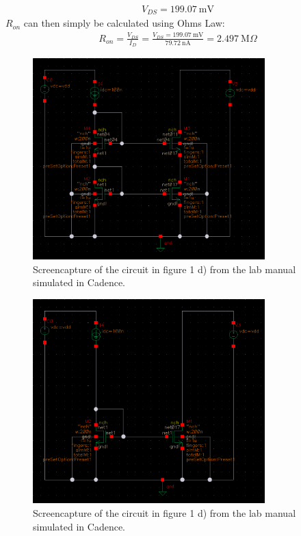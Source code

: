 \documentclass[onecolumn]{article}
\begin{document}
\begin{align}
    V_{DS} = 199.07 \ \text{mV} \nonumber
\end{align}
$R_{on}$ can then simply be calculated using Ohms Law:
\begin{align}
    R_{on} = \frac{V_{DS}}{I_D} = \frac{V_{DS} = 199.07 \ \text{mV}}{79.72 \ \text{nA}} = 2.497 \ \text{M}\Omega
\end{align}
\begin{figure}[h!]
    \centering
    \includegraphics[width=0.8\textwidth]{circuit_d_cascode.png}
    \caption{Screencapture of the circuit in figure 1 d) from the lab manual simulated in Cadence.}
    \label{fig:circuitd}
\end{figure}

\begin{figure}[h!]
    \centering
    \includegraphics[width=0.8\textwidth]{circuit_d_simple.png}
    \caption{Screencapture of the circuit in figure 1 d) from the lab manual simulated in Cadence.}
    \label{fig:circuitdsimple}
\end{figure}
\end{document}
